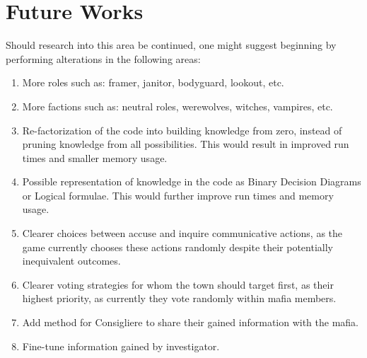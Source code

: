 \section{Future Works}\label{sec:future-works}
Should research into this area be continued, one might suggest beginning by
performing alterations in the following areas:
\begin{enumerate}
	\item More roles such as: framer, janitor, bodyguard, lookout, etc.
	\item More factions such as: neutral roles, werewolves, witches, vampires, etc.
	\item Re-factorization of the code into building knowledge from zero, instead of
	      pruning knowledge from all possibilities. This would result in improved run
	      times and smaller memory usage.
	\item Possible representation of knowledge in the code as Binary Decision Diagrams or
	      Logical formulae. This would further improve run times and memory usage.
	\item Clearer choices between accuse and inquire communicative actions, as the game
	      currently chooses these actions randomly despite their potentially inequivalent
	      outcomes.
	\item Clearer voting strategies for whom the town should target first, as their
	      highest priority, as currently they vote randomly within mafia members.
	\item Add method for Consigliere to share their gained information with the mafia.
	\item Fine-tune information gained by investigator.
\end{enumerate}